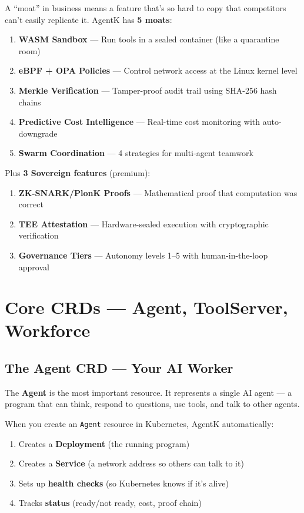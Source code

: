 \documentclass[12pt,a4paper,openany]{report}
\begin{document}
A ``moat'' in business means a feature that's so hard to copy that competitors can't easily replicate it. AgentK has \textbf{5 moats}:

\begin{enumerate}[label=\textbf{Moat \arabic*:}]
    \item \textbf{WASM Sandbox} — Run tools in a sealed container (like a quarantine room)
    \item \textbf{eBPF + OPA Policies} — Control network access at the Linux kernel level
    \item \textbf{Merkle Verification} — Tamper-proof audit trail using SHA-256 hash chains
    \item \textbf{Predictive Cost Intelligence} — Real-time cost monitoring with auto-downgrade
    \item \textbf{Swarm Coordination} — 4 strategies for multi-agent teamwork
\end{enumerate}

Plus \textbf{3 Sovereign features} (premium):
\begin{enumerate}[label=\textbf{Sovereign \arabic*:}]
    \item \textbf{ZK-SNARK/PlonK Proofs} — Mathematical proof that computation was correct
    \item \textbf{TEE Attestation} — Hardware-sealed execution with cryptographic verification
    \item \textbf{Governance Tiers} — Autonomy levels 1–5 with human-in-the-loop approval
\end{enumerate}


\chapter{Core CRDs — Agent, ToolServer, Workforce}

\section{The Agent CRD — Your AI Worker}

The \textbf{Agent} is the most important resource. It represents a single AI agent — a program that can think, respond to questions, use tools, and talk to other agents.

\begin{keyconceptbox}
When you create an \texttt{Agent} resource in Kubernetes, AgentK automatically:
\begin{enumerate}
    \item Creates a \textbf{Deployment} (the running program)
    \item Creates a \textbf{Service} (a network address so others can talk to it)
    \item Sets up \textbf{health checks} (so Kubernetes knows if it's alive)
    \item Tracks \textbf{status} (ready/not ready, cost, proof chain)
\end{enumerate}
\end{keyconceptbox}
\end{document}
